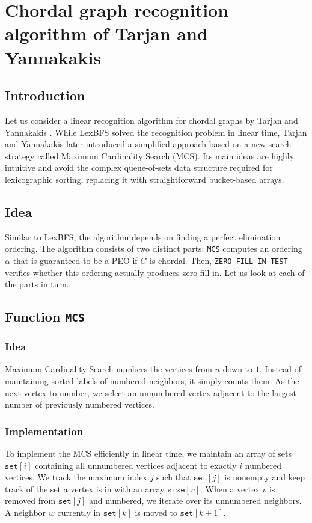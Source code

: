 \chapter{Chordal graph recognition algorithm of Tarjan and Yannakakis}

\section{Introduction}
Let us consider a linear recognition algorithm for chordal graphs by Tarjan and Yannakakis \cite{TarjanYannakakis1984}. While LexBFS solved the recognition problem in linear time, Tarjan and Yannakakis later introduced a simplified approach based on a new search strategy called Maximum Cardinality Search (MCS). Its main ideas are highly intuitive and avoid the complex queue-of-sets data structure required for lexicographic sorting, replacing it with straightforward bucket-based arrays.

\section{Idea}
Similar to LexBFS, the algorithm depends on finding a perfect elimination ordering. The algorithm consists of two distinct parts: \texttt{MCS} computes an ordering $\alpha$ that is guaranteed to be a PEO if $G$ is chordal. Then, \texttt{ZERO-FILL-IN-TEST} verifies whether this ordering actually produces zero fill-in.
Let us look at each of the parts in turn.

\section{Function \texttt{MCS}}

\subsection{Idea}
Maximum Cardinality Search numbers the vertices from $n$ down to $1$. Instead of maintaining sorted labels of numbered neighbors, it simply counts them. As the next vertex to number, we select an unnumbered vertex adjacent to the largest number of previously numbered vertices.

\subsection{Implementation}
To implement the MCS efficiently in linear time, we maintain an array of sets $\texttt{set}[i]$ containing all unnumbered vertices adjacent to exactly $i$ numbered vertices. We track the maximum index $j$ such that $\texttt{set}[j]$ is nonempty and keep track of the set a vertex is in with an array $\texttt{size}[v]$. When a vertex $v$ is removed from $\texttt{set}[j]$ and numbered, we iterate over its unnumbered neighbors. A neighbor $w$ currently in $\texttt{set}[k]$ is moved to $\texttt{set}[k+1]$. 

